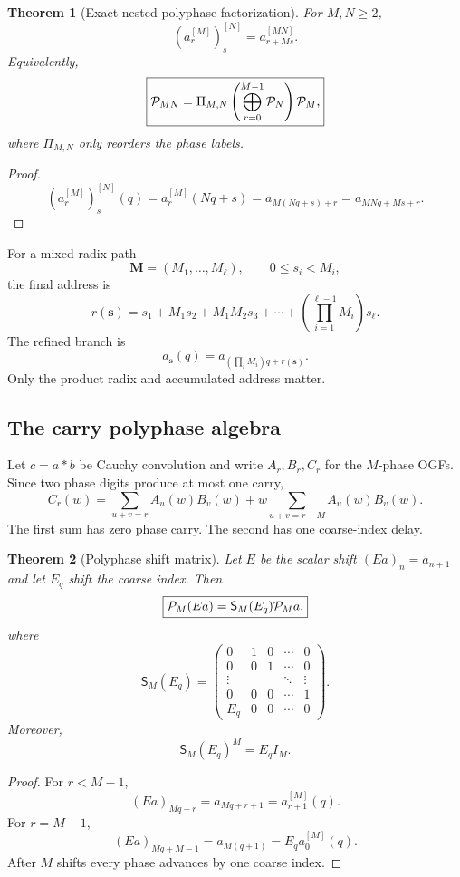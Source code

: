 \documentclass[11pt]{article}
\newtheorem{theorem}{Theorem}[section]\newtheorem{proposition}[theorem]{Proposition}\newtheorem{lemma}[theorem]{Lemma}\newtheorem{corollary}[theorem]{Corollary}
\theoremstyle{definition}\newtheorem{definition}[theorem]{Definition}\newtheorem{example}[theorem]{Example}\newtheorem{construction}[theorem]{Construction}\newtheorem{algorithm}[theorem]{Algorithm}\newtheorem{conjecture}[theorem]{Conjecture}\newtheorem{problem}[theorem]{Problem}
\theoremstyle{remark}\newtheorem{remark}[theorem]{Remark}\newtheorem{boundary}[theorem]{Boundary}\newtheorem{certificate}[theorem]{Computational Certificate}\newtheorem{classical}[theorem]{Classical Input}\newtheorem{principle}[theorem]{Structural Principle}
\begin{document}
\begin{theorem}[Exact nested polyphase factorization]
For $M,N\geq2$,
\[
 \boxed{\left(a_r^{[M]}\right)_s^{[N]}=a_{r+Ms}^{[MN]}.}
\]
Equivalently,
\[
 \boxed{\mathcal P_{MN}=\Pi_{M,N}\left(\bigoplus_{r=0}^{M-1}\mathcal P_N\right)\mathcal P_M,}
\]
where $\Pi_{M,N}$ only reorders the phase labels.
\end{theorem}

\begin{proof}
\[
 \left(a_r^{[M]}\right)_s^{[N]}(q)
 =a_r^{[M]}(Nq+s)=a_{M(Nq+s)+r}=a_{MNq+Ms+r}.
\]
\end{proof}

For a mixed-radix path
\[
 \mathbf M=(M_1,\ldots,M_\ell),\qquad0\leq s_i<M_i,
\]
the final address is
\[
 \boxed{r(\mathbf s)=s_1+M_1s_2+M_1M_2s_3+\cdots+\left(\prod_{i=1}^{\ell-1}M_i\right)s_\ell.}
\]
The refined branch is
\[
 a_{\mathbf s}(q)=a_{(\prod_iM_i)q+r(\mathbf s)}.
\]
Only the product radix and accumulated address matter.

\subsection{The carry polyphase algebra}
Let $c=a*b$ be Cauchy convolution and write $A_r,B_r,C_r$ for the $M$-phase OGFs. Since two phase digits produce at most one carry,
\[
 \boxed{C_r(w)=\sum_{u+v=r}A_u(w)B_v(w)+w\sum_{u+v=r+M}A_u(w)B_v(w).}
\]
The first sum has zero phase carry. The second has one coarse-index delay.

\begin{theorem}[Polyphase shift matrix]
Let $E$ be the scalar shift $(Ea)_n=a_{n+1}$ and let $E_q$ shift the coarse index. Then
\[
 \boxed{\mathcal P_M(Ea)=\mathsf S_M(E_q)\mathcal P_Ma,}
\]
where
\[
 \mathsf S_M(E_q)=
 \begin{pmatrix}
 0&1&0&\cdots&0\\
 0&0&1&\cdots&0\\
 \vdots&&&\ddots&\vdots\\
 0&0&0&\cdots&1\\
 E_q&0&0&\cdots&0
 \end{pmatrix}.
\]
Moreover,
\[
 \boxed{\mathsf S_M(E_q)^M=E_qI_M.}
\]
\end{theorem}

\begin{proof}
For $r<M-1$,
\[
 (Ea)_{Mq+r}=a_{Mq+r+1}=a_{r+1}^{[M]}(q).
\]
For $r=M-1$,
\[
 (Ea)_{Mq+M-1}=a_{M(q+1)}=E_qa_0^{[M]}(q).
\]
After $M$ shifts every phase advances by one coarse index.
\end{proof}
\end{document}

